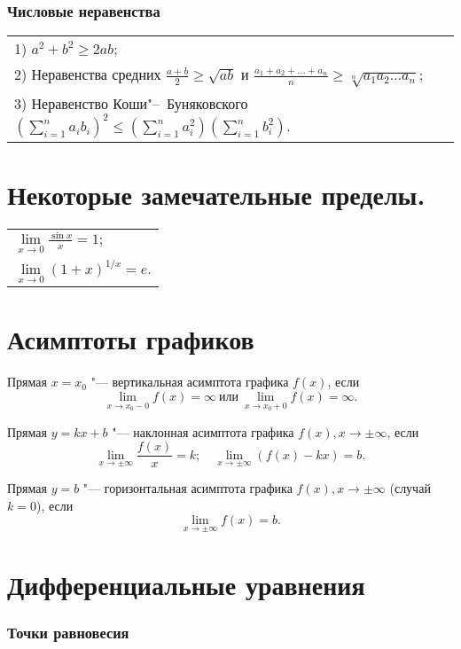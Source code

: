 \subsubsection{Числовые неравенства}

\begin{longtable}[l]{l}
	1) $a^2+b^2 \ge 2ab;$ \\
	2) Неравенства средних $\frac{a+b}{2} \ge \sqrt{ab}$ и $\frac{a_1+a_2+\ldots+a_n}{n} \ge \sqrt[n]{a_1 a_2\ldots a_n}$; \\
	3) Неравенство Коши"--~Буняковского $\left(\sum_{i=1}^n a_i b_i\right)^2 \le \left(\sum_{i=1}^n a_i^2\right) \left(\sum_{i=1}^n b_i^2\right)$.
\end{longtable}

\section{Некоторые замечательные пределы.}
\begin{longtable}[l]{l}
$\lim\limits_{x\to0}\frac{\sin x}{x}=1;$
\\
$\lim\limits_{x\to0} (1+x)^{1/x}=e.$
\end{longtable}

\section{Асимптоты графиков}
\textbullet \quad
Прямая $x=x_0$ "--- вертикальная асимптота графика $f(x)$, если $$\lim\limits_{x\to x_0-0}f(x)=\infty\ \text{или}\ \lim\limits_{x\to x_0+0}f(x)=\infty.$$ 

\textbullet \quad
Прямая $y=kx+b$ "--- наклонная асимптота графика $f(x), x\to\pm\infty$, если $$\lim\limits_{x\to\pm\infty}\frac{f(x)}{x}=k; \quad \lim\limits_{x\to\pm\infty} (f(x)-kx)=b.$$

\textbullet \quad
Прямая $y=b$ "--- горизонтальная асимптота графика $f(x), x\to\pm\infty$ (случай $k=0$), если $$ \lim\limits_{x\to\pm\infty} f(x)=b.$$


\section{Дифференциальные уравнения}
\subsubsection {Точки равновесия}


